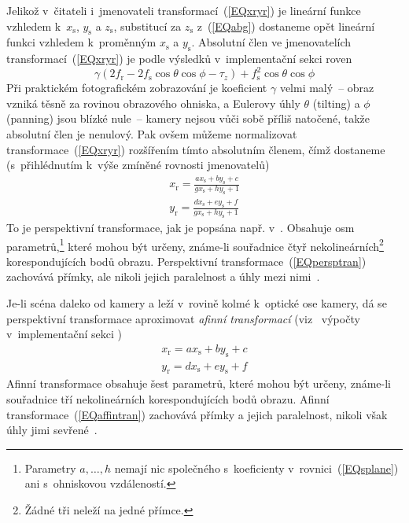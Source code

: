 Jelikož v~čitateli i~jmenovateli transformací~(\ref{EQxryr}) je lineární
funkce vzhledem k~$x_{\mathrm{s}}$, $y_{\mathrm{s}}$ a $z_{\mathrm{s}}$,
substitucí za $z_{\mathrm{s}}$ z~(\ref{EQabg}) dostaneme opět lineární funkci
vzhledem k~proměnným $x_{\mathrm{s}}$ a $y_{\mathrm{s}}$. Absolutní člen ve
jmenovatelích transformací~(\ref{EQxryr}) je podle výsledků v~implementační
sekci  roven
\begin{equation}
  \gamma\left(2f_{\mathrm{r}}-2f_{\mathrm{s}}\cos\theta\cos\phi-\tau_{z}\right)
  + f_{\mathrm{s}}^{2}\cos\theta\cos\phi                           \label{EQabsden}
\end{equation}
Při praktickém fotografickém zobrazování je koeficient $\gamma$ velmi malý~--
obraz vzniká těsně za rovinou obrazového ohniska, a Eulerovy úhly $\theta$
(tilting) a $\phi$ (panning) jsou blízké nule~-- kamery nejsou vůči sobě
příliš natočené, takže absolutní člen je nenulový. Pak ovšem můžeme
normalizovat transformace~(\ref{EQxryr}) rozšířením tímto absolutním členem,
čímž dostaneme (s~přihlédnutím k~výše zmíněné rovnosti jmenovatelů)
\begin{subequations}\label{EQpersptran}
  \begin{align}
  x_{\mathrm{r}}
  = \frac{ax_{\mathrm{s}}+by_{\mathrm{s}}+c}%
         {gx_{\mathrm{s}}+hy_{\mathrm{s}}+1}\\
  y_{\mathrm{r}}
  = \frac{dx_{\mathrm{s}}+ey_{\mathrm{s}}+f}%
         {gx_{\mathrm{s}}+hy_{\mathrm{s}}+1}
  \end{align}
\end{subequations}
To je perspektivní transformace, jak je popsána
např. v~\cite{Gon-Woo:2007:DigImageProc:3,%
  AGo:2012:ImageReg:2012}. Obsahuje
osm parametrů,\footnote{Parametry $a,\ldots,h$ nemají nic společného
  s~koeficienty v~rovnici~(\ref{EQsplane}) ani s~ohniskovou vzdáleností.}
které mohou být určeny, známe-li souřadnice čtyř nekolineárních\footnote{Žádné
tři neleží na jedné přímce.}
korespondujících bodů obrazu. Perspektivní transformace~(\ref{EQpersptran})
zachovává přímky, ale nikoli jejich paralelnost a úhly mezi
nimi~\cite{AGo:2012:ImageReg:2012,%
  Son-Hla-Boy:2007:ImPrAnMachVi:3}.

Je-li scéna daleko od kamery a leží v~rovině kolmé k~optické ose kamery, dá se
perspektivní transformace aproximovat \emph{afinní transformací}
(viz~\cite{AGo:2012:ImageReg:2012} výpočty v~implementační sekci
)
\begin{subequations}\label{EQaffintran}
  \begin{align}
  x_{\mathrm{r}} = ax_{\mathrm{s}}+by_{\mathrm{s}}+c\\
  y_{\mathrm{r}} = dx_{\mathrm{s}}+ey_{\mathrm{s}}+f
  \end{align}
\end{subequations}
Afinní transformace obsahuje šest parametrů, které mohou být určeny,
zná\-me-li souřadnice tří nekolineárních korespondujících bodů obrazu. Afinní
transformace~(\ref{EQaffintran}) zachovává přímky a jejich paralelnost, nikoli
však úhly jimi sevřené~\cite{AGo:2012:ImageReg:2012}.

